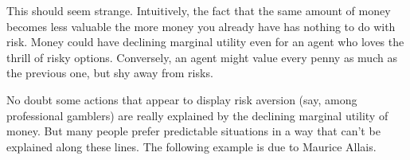 This should seem strange. Intuitively, the fact that the same amount of money
becomes less valuable the more money you already have has nothing to do with risk.
Money could have declining marginal utility even for an agent who loves the
thrill of risky options. Conversely, an agent might value every penny as much as
the previous one, but shy away from risks.



No doubt some actions that appear to display risk aversion (say, among
professional gamblers) are really explained by the declining marginal utility of
money. But many people prefer predictable situations in a way
that can't be explained along these lines. The following example is due to
Maurice Allais.

